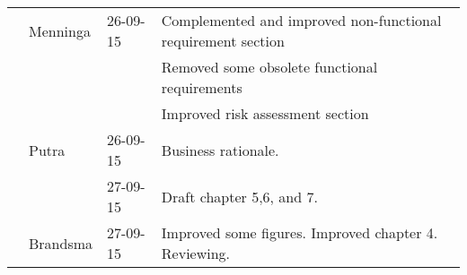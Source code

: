 \begin{longtable}{L{} L{} L{} L{}}
	                 & Menninga              & 26-09-15      & Complemented and improved non-functional requirement section                                                                                                                                                               \\
	                 &                       &               & Removed some obsolete functional requirements                                                                                                                                                                              \\
	                 &                       &               & Improved risk assessment section                                                                                                                                                                                           \\
	                 & Putra                 & 26-09-15      & Business rationale.                                                                                                                                                                                                        \\
	                 &                       & 27-09-15      & Draft chapter 5,6, and 7.                                                                                                                                                                                                  \\
	                 & Brandsma              & 27-09-15      & Improved some figures. Improved chapter 4. Reviewing.                                                                                                                                                                      \\
	\midrule
			

\end{longtable}
